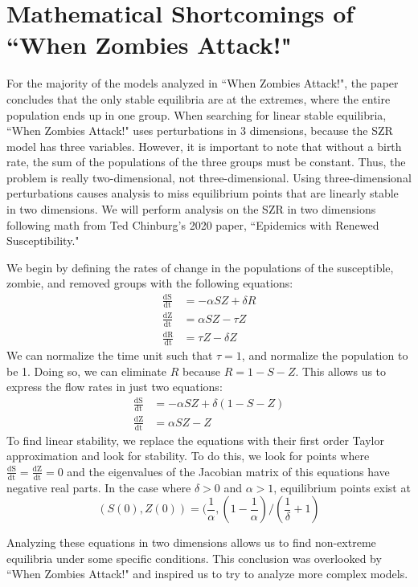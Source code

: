 \documentclass{article}
\begin{document}
\section{Mathematical Shortcomings of ``When Zombies Attack!"}
For the majority of the models analyzed in ``When Zombies Attack!", the paper concludes that the only stable equilibria are at the extremes, where the entire population ends up in one group. When searching for linear stable equilibria, ``When Zombies Attack!" uses perturbations in 3 dimensions, because the SZR model has three variables. However, it is important to note that without a birth rate, the sum of the populations of the three groups must be constant. Thus, the problem is really two-dimensional, not three-dimensional. Using three-dimensional perturbations causes analysis to miss equilibrium points that are linearly stable in two dimensions. We will perform analysis on the SZR in two dimensions following math from Ted Chinburg's 2020 paper, ``Epidemics with Renewed Susceptibility."

We begin by defining the rates of change in the populations of the susceptible, zombie, and removed groups with the following equations:
\begin{align*}
    \frac{\mathrm{dS}}{\mathrm{dt}} &= -\alpha S Z + \delta R \\
    \frac{\mathrm{dZ}}{\mathrm{dt}} &= \alpha S Z - \tau Z \\
    \frac{\mathrm{dR}}{\mathrm{dt}} &= \tau Z - \delta Z  
\end{align*}
We can normalize the time unit such that $\tau = 1$, and normalize the population to be 1. Doing so, we can eliminate $R$ because $R = 1 - S - Z$. This allows us to express the flow rates in just two equations:
\begin{align*}
    \frac{\mathrm{dS}}{\mathrm{dt}} &= -\alpha S Z + \delta (1-S-Z) \\
    \frac{\mathrm{dZ}}{\mathrm{dt}} &= \alpha S Z - Z
\end{align*}
To find linear stability, we replace the equations with their first order Taylor approximation and look for stability. To do this, we look for points where $\frac{\mathrm{dS}}{\mathrm{dt}} = \frac{\mathrm{dZ}}{\mathrm{dt}} = 0$ and the eigenvalues of the Jacobian matrix of this equations have negative real parts. In the case where $\delta > 0$ and $\alpha > 1$, equilibrium points exist at $$(S(0), Z(0)) = (\frac{1}{\alpha}, (1-\frac{1}{\alpha})/(\frac{1}{\delta} + 1)$$

Analyzing these equations in two dimensions allows us to find non-extreme equilibria under some specific conditions. This conclusion was overlooked by ``When Zombies Attack!" and inspired us to try to analyze more complex models.
\end{document}
